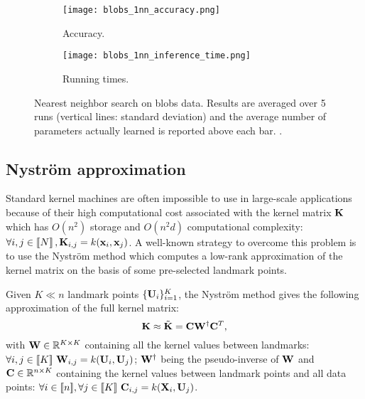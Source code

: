 \begin{figure}[tbh]
\centering
\begin{subfigure}[b]{.49\textwidth}
\texttt{[image: blobs\_1nn\_accuracy.png]}
\caption{Accuracy.}
\label{fig:nn:blobs:accuracy}
\end{subfigure}
\begin{subfigure}[b]{.49\textwidth}
\texttt{[image: blobs\_1nn\_inference\_time.png]}
\caption{Running times.}
\label{fig:nn:blobs:times}
\end{subfigure}

\caption{Nearest neighbor search on blobs data. Results are averaged over 5 runs (vertical lines: standard deviation) and the average number of parameters actually learned is reported above each bar. . }
\label{fig:nn:blobs}
\end{figure}

\subsection{Nyström approximation}

Standard kernel machines are often impossible to use in large-scale applications because of their high computational cost associated with the kernel matrix ${\mathbf{K}}$ which has $O(n^2)$ storage and $O(n^2d)$ computational complexity: $\forall i,j \in\left \llbracket N\right \rrbracket, {\mathbf{K}}_{i,j} = k({\mathbf{x}}_i, {\mathbf{x}}_j)$. A well-known strategy to overcome this problem is to use the Nyström method which computes a low-rank approximation of the kernel matrix on the basis of some pre-selected landmark points. 

Given $K \ll n$ landmark points $\{{\mathbf{U}}_i\}_{i=1}^{K}$, the Nyström method gives the following approximation of the full kernel matrix:
%
\begin{equation}
 \label{eq:nystrom}
 {\mathbf{K}} \approx \tilde{{\mathbf{K}}} = {\mathbf{C}}{\mathbf{W}}^\dagger{\mathbf{C}}^T,
\end{equation}
%
with ${\mathbf{W}} \in \mathbb{R}^{K \times K}$ containing all the kernel values between landmarks: $\forall i,j \in [\![K]\!]~ {\mathbf{W}}_{i,j} = k({\mathbf{U}}_i, {\mathbf{U}}_j)$; ${\mathbf{W}}^\dagger$ being the pseudo-inverse of ${\mathbf{W}}$ and ${\mathbf{C}} \in \mathbb{R}^{n \times K}$ containing the kernel values between landmark points and all data points: $\forall i \in [\![n]\!], \forall j \in [\![K]\!]~ {\mathbf{C}}_{i, j} = k({\mathbf{X}}_i, {\mathbf{U}}_j)$.

